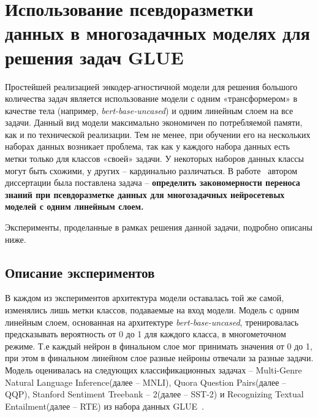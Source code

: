 \chapter{Использование псевдоразметки данных в многозадачных моделях для решения задач GLUE}\label{ch:pseudolabel}

Простейшей реализацией энкодер-агностичной модели для решения большого количества задач является использование модели с одним «трансформером» в качестве тела (например, \textit{bert-base-uncased}) и одним линейным слоем на все задачи. Данный вид модели максимально экономичен по потребляемой памяти, как и по технической реализации. Тем не менее, при обучении его на нескольких наборах данных возникает проблема, так как у каждого набора данных есть метки только для классов «своей» задачи. У некоторых наборов данных классы могут быть схожими, у других -- кардинально различаться. В работе~\cite{pseudolabel} автором диссертации была поставлена задача -- \textbf{определить закономерности переноса знаний при псевдоразметке данных для многозадачных нейросетевых моделей с одним линейным слоем.}

Эксперименты, проделанные в рамках решения данной задачи, подробно описаны ниже.




\section{Описание экспериментов}\label{ch:pseudolabel/sect1}
В каждом из экспериментов архитектура модели оставалась той же самой, изменялись лишь метки классов, подаваемые на вход модели. Модель с одним линейным слоем, основанная на архитектуре \textit{bert-base-uncased}, тренировалась предсказывать вероятность от 0 до 1 для каждого класса, в многометочном режиме. Т.е каждый нейрон в финальном слое мог принимать значения от 0 до 1, при этом в финальном линейном слое разные нейроны отвечали за разные задачи.
Модель оценивалась на следующих классификационных задачах -- Multi-Genre Natural Language Inference(далее -- MNLI), Quora Question Pairs(далее -- QQP), Stanford Sentiment Treebank -- 2(далее -- SST-2) и Recognizing Textual Entailment(далее -- RTE) из набора данных GLUE~\cite{wang_2018}. 


